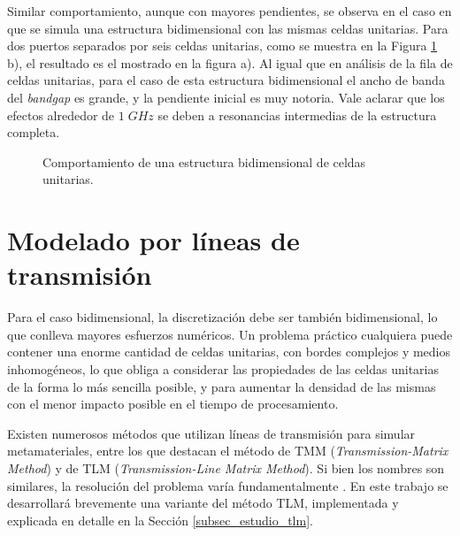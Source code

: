 Similar comportamiento, aunque con mayores pendientes, se observa en el caso en que se simula una estructura bidimensional con las mismas celdas unitarias. Para dos puertos separados por seis celdas unitarias, como se muestra en la Figura \ref{fig:s12-estructura2d-super} b), el resultado es el mostrado en la figura a). Al igual que en análisis de la fila de celdas unitarias, para el caso de esta estructura bidimensional el ancho de banda del \textit{bandgap} es grande, y la pendiente inicial es muy notoria. Vale aclarar que los efectos alrededor de $1\; GHz$ se deben a resonancias intermedias de la estructura completa.


\begin{figure}[h]
	\centering 
	\hspace{0pt}
	\caption{Comportamiento de una estructura bidimensional de celdas unitarias.}
	\label{fig:s12-estructura2d-super}	
\end{figure}  



\section{Modelado por líneas de transmisión}

Para el caso bidimensional, la discretización debe ser también bidimensional, lo que conlleva mayores esfuerzos numéricos. Un problema práctico cualquiera puede contener una enorme cantidad de celdas unitarias, con bordes complejos y medios inhomogéneos, lo que obliga a considerar las propiedades de las celdas unitarias de la forma lo más sencilla posible, y para aumentar la densidad de las mismas con el menor impacto posible en el tiempo de procesamiento.

Existen numerosos métodos que utilizan líneas de transmisión para simular metamateriales, entre los que destacan el método de TMM (\textit{Transmission-Matrix Method}) y de TLM (\textit{Transmission-Line Matrix Method}). Si bien los nombres son similares, la resolución del problema varía fundamentalmente \cite{Caloz:ElectromagneticMetamaterials}. En este trabajo se desarrollará brevemente una variante del método TLM, implementada y explicada en detalle en la Sección \ref{subsec_estudio_tlm}.

